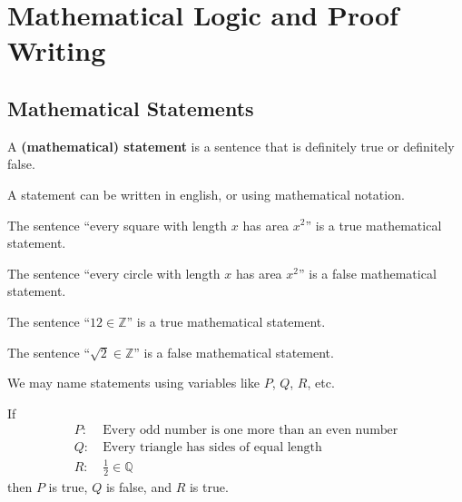 \chapter{Mathematical Logic and Proof Writing}
\section{Mathematical Statements}
\begin{definition}
    A \textbf{(mathematical) statement} is a sentence that is definitely true or definitely false.
\end{definition}
\begin{remark}
    A statement can be written in english, or using mathematical notation.
\end{remark}
\begin{example}
    The sentence ``every square with length $x$ has area $x^2$'' is a true mathematical statement.
\end{example}
\begin{example}
    The sentence ``every circle with length $x$ has area $x^2$'' is a false mathematical statement.
\end{example}
\begin{example}
    The sentence ``$12 \in \mathbb{Z}$'' is a true mathematical statement.
\end{example}
\begin{example}
    The sentence ``$\sqrt2 \in \mathbb{Z}$'' is a false mathematical statement.
\end{example}

We may name statements using variables like $P$, $Q$, $R$, etc.
\begin{example}
    If
    \begin{align*}
        P: &\ \text{Every odd number is one more than an even number}\\
        Q: &\ \text{Every triangle has sides of equal length}\\
        R: &\ \frac12 \in \mathbb{Q}
    \end{align*}
    then $P$ is true, $Q$ is false, and $R$ is true.
\end{example}

